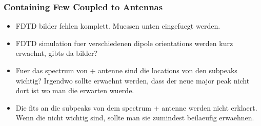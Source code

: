 		\subsubsection{\Nds Containing Few \sivs Coupled to Antennas} \label{subsubsection::antenna_single_siv}

				\begin{remark}
					\begin{itemize}
						\item FDTD bilder fehlen komplett. Muessen unten eingefuegt werden.
						\item FDTD simulation fuer verschiedenen dipole orientations werden kurz erwaehnt, gibts da bilder?
						\item Fuer das spectrum von \nd + antenne sind die locations von den subpeaks wichtig? Irgendwo sollte erwaehnt werden, dass der neue major peak nicht dort ist wo man die \siv \zpl erwarten wuerde.
						\item Die fits an die subpeaks von dem spectrum \nd + antenne werden nicht erklaert. Wenn die nicht wichtig sind, sollte man sie zumindest beilaeufig erwaehnen.
					\end{itemize}
				\end{remark}

